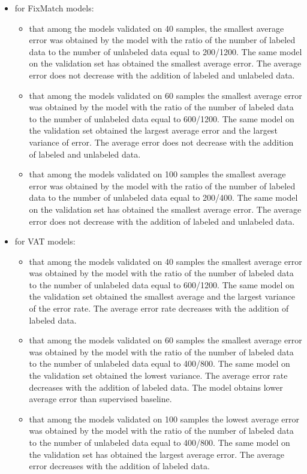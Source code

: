 \documentclass[12pt]{article}
\theoremstyle{definition}
\DeclareRobustCommand{\[}{\begin{equation}}
\DeclareRobustCommand{\]}{\end{equation}}
\begin{document}
\begin{itemize}
    \item for FixMatch models:
    \begin{itemize}
        \item that among the models validated on 40 samples, the smallest average error was obtained by the model with the ratio of the number of labeled data to the number of unlabeled data equal to 200/1200. The same model on the validation set has obtained the smallest average error. The average error does not decrease with the addition of labeled and unlabeled data.
         \item that among the models validated on 60 samples the smallest average error was obtained by the model with the ratio of the number of labeled data to the number of unlabeled data equal to 600/1200. The same model on the validation set obtained the largest average error and the largest variance of error.  The average error does not decrease with the addition of labeled and unlabeled data. 
        \item that among the models validated on 100 samples the smallest average error was obtained by the model with the ratio of the number of labeled data to the number of unlabeled data equal to 200/400. The same model on the validation set has obtained the smallest average error. The average error does not decrease with the addition of labeled and unlabeled data.
    \end{itemize}
    \item for VAT models:
    \begin{itemize}
        \item that among the models validated on 40 samples the smallest average error was obtained by the model with the ratio of the number of labeled data to the number of unlabeled data equal to 600/1200. The same model on the validation set obtained the smallest average and the largest variance of the error rate. The average error rate decreases with the addition of labeled data.
        \item that among the models validated on 60 samples the smallest average error was obtained by the model with the ratio of the number of labeled data to the number of unlabeled data equal to 400/800. The same model on the validation set obtained the lowest variance. The average error rate decreases with the addition of labeled data. The model obtains lower average error than supervised baseline.
        \item that among the models validated on 100 samples the lowest average error was obtained by the model with the ratio of the number of labeled data to the number of unlabeled data equal to 400/800. The same model on the validation set has obtained the largest average error. The average error decreases with the addition of labeled data. 
    \end{itemize}
\end{itemize}
\end{document}

